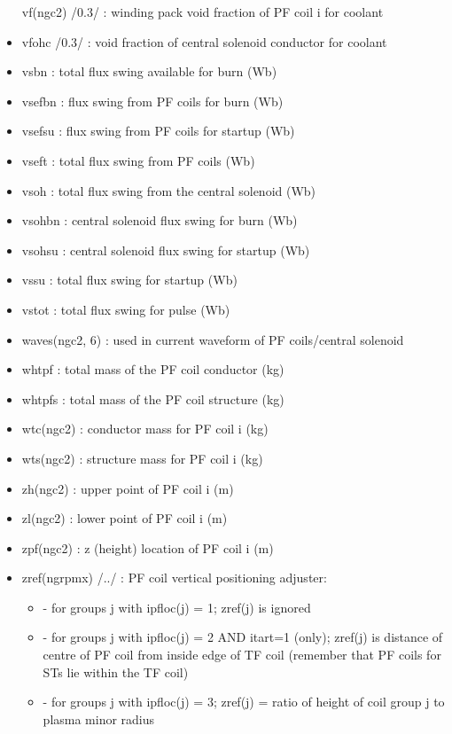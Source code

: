 \documentclass[]{article}
\begin{document}
\begin{itemize}
  vf(ngc2) /0.3/ : winding pack void fraction of PF coil i for coolant
\item
  vfohc /0.3/ : void fraction of central solenoid conductor for coolant
\item
  vsbn : total flux swing available for burn (Wb)
\item
  vsefbn : flux swing from PF coils for burn (Wb)
\item
  vsefsu : flux swing from PF coils for startup (Wb)
\item
  vseft : total flux swing from PF coils (Wb)
\item
  vsoh : total flux swing from the central solenoid (Wb)
\item
  vsohbn : central solenoid flux swing for burn (Wb)
\item
  vsohsu : central solenoid flux swing for startup (Wb)
\item
  vssu : total flux swing for startup (Wb)
\item
  vstot : total flux swing for pulse (Wb)
\item
  waves(ngc2, 6) : used in current waveform of PF coils/central solenoid
\item
  whtpf : total mass of the PF coil conductor (kg)
\item
  whtpfs : total mass of the PF coil structure (kg)
\item
  wtc(ngc2) : conductor mass for PF coil i (kg)
\item
  wts(ngc2) : structure mass for PF coil i (kg)
\item
  zh(ngc2) : upper point of PF coil i (m)
\item
  zl(ngc2) : lower point of PF coil i (m)
\item
  zpf(ngc2) : z (height) location of PF coil i (m)
\item
  zref(ngrpmx) /../ : PF coil vertical positioning adjuster:

  \begin{itemize}
  \itemsep1pt\parskip0pt
  \item
    - for groups j with ipfloc(j) = 1; zref(j) is ignored
  \item
    - for groups j with ipfloc(j) = 2 AND itart=1 (only); zref(j) is
    distance of centre of PF coil from inside edge of TF coil (remember
    that PF coils for STs lie within the TF coil)
  \item
    - for groups j with ipfloc(j) = 3; zref(j) = ratio of height of coil
    group j to plasma minor radius
  \end{itemize}
\end{itemize}
\end{document}
